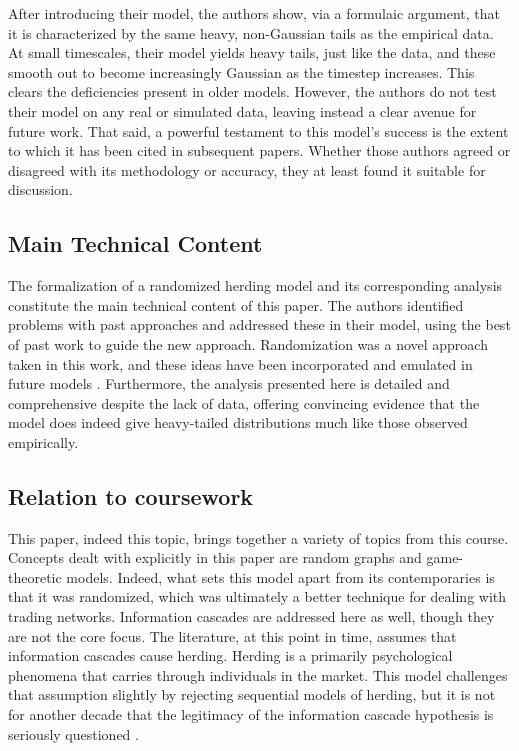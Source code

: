 \documentclass{article}
\begin{document}
After introducing their model, the authors show, via a formulaic argument, that it is characterized by the same heavy, non-Gaussian tails as the empirical data. 
At small timescales, their model yields heavy tails, just like the data, and these smooth out to become increasingly Gaussian as the timestep increases.
This clears the deficiencies present in older models. 
However, the authors do not test their model on any real or simulated data, leaving instead a clear avenue for future work.
That said, a powerful testament to this model's success is the extent to which it has been cited in subsequent papers.
Whether those authors agreed or disagreed with its methodology or accuracy, they at least found it suitable for discussion.

\subsection{Main Technical Content}
The formalization of a randomized herding model and its corresponding analysis constitute the main technical content of this paper.
The authors identified problems with past approaches and addressed these in their model, using the best of past work to guide the new approach.
Randomization was a novel approach taken in this work, and these ideas have been incorporated and emulated in future models \cite{lin}.
Furthermore, the analysis presented here is detailed and comprehensive despite the lack of data, offering convincing evidence that the model does indeed give heavy-tailed distributions much like those observed empirically.

\subsection{Relation to coursework}
This paper, indeed this topic, brings together a variety of topics from this course. 
Concepts dealt with explicitly in this paper are random graphs and game-theoretic models.
Indeed, what sets this model apart from its contemporaries is that it was randomized, which was ultimately a better technique for dealing with trading networks.
Information cascades are addressed here as well, though they are not the core focus.
The literature, at this point in time, assumes that information cascades cause herding.
Herding is a primarily psychological phenomena that carries through individuals in the market.
This model challenges that assumption slightly by rejecting sequential models of herding, but it is not for another decade that the legitimacy of the information cascade hypothesis is seriously questioned \cite{lin}.
\end{document}
